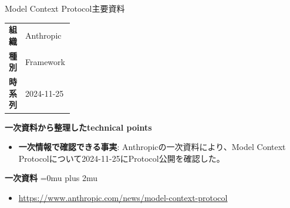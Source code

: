 \begin{technicalnote}{Model Context Protocol}{主要資料}
\begingroup
\begin{tabularx}{\linewidth}{@{}>{\bfseries}p{0.22\linewidth}X@{}}
組織 & Anthropic \\
種別 & Framework \\
時系列 & 2024-11-25 \\
\end{tabularx}
\smallskip
{\bfseries 一次資料から整理したtechnical points}
\begin{itemize}[leftmargin=1.5em,itemsep=0.35em]
\item \textbf{一次情報で確認できる事実}: Anthropicの一次資料により、Model Context Protocolについて2024-11-25にProtocol公開を確認した。
\end{itemize}
\begin{minipage}{\linewidth}
\begin{samepage}
{\bfseries 一次資料}
\begingroup\sloppy
\Urlmuskip=0mu plus 2mu\relax
\begin{itemize}[leftmargin=1.5em,itemsep=0.25em]
\item {\scriptsize\url{https://www.anthropic.com/news/model-context-protocol}}
\end{itemize}
\endgroup
\end{samepage}
\end{minipage}
\endgroup
\end{technicalnote}
\medskip

